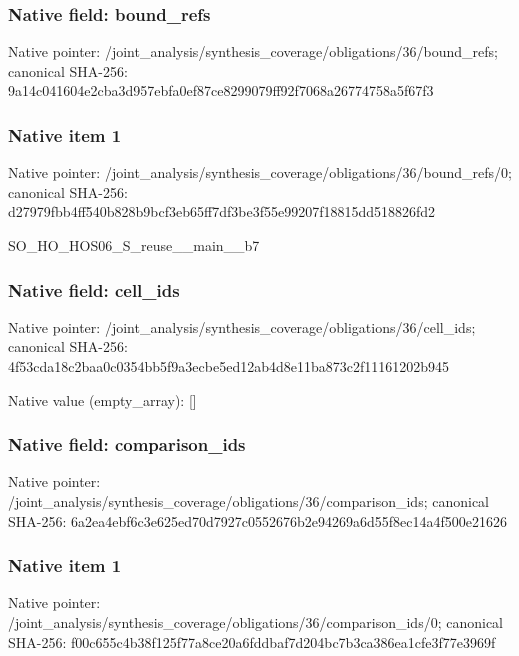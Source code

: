 \documentclass[10pt,a4paper]{article}
\begin{document}
\subsubsection{Native field: bound\_\allowbreak{}refs}
Native pointer: /joint\_\allowbreak{}analysis/synthesis\_\allowbreak{}coverage/obligations/36/bound\_\allowbreak{}refs; canonical SHA-256: 9a14c041604e2cba3d957ebfa0ef87ce8299079ff92f7068a26774758a5f67f3

\subsubsection{Native item 1}
Native pointer: /joint\_\allowbreak{}analysis/synthesis\_\allowbreak{}coverage/obligations/36/bound\_\allowbreak{}refs/0; canonical SHA-256: d27979fbb4ff540b828b9bcf3eb65ff7df3be3f55e99207f18815dd518826fd2

\begingroup\raggedright\sloppy SO\_\allowbreak{}HO\_\allowbreak{}HOS06\_\allowbreak{}S\_\allowbreak{}reuse\_\allowbreak{}\_\allowbreak{}main\_\allowbreak{}\_\allowbreak{}b7\par\endgroup

\subsubsection{Native field: cell\_\allowbreak{}ids}
Native pointer: /joint\_\allowbreak{}analysis/synthesis\_\allowbreak{}coverage/obligations/36/cell\_\allowbreak{}ids; canonical SHA-256: 4f53cda18c2baa0c0354bb5f9a3ecbe5ed12ab4d8e11ba873c2f11161202b945

Native value (empty\_\allowbreak{}array): []

\subsubsection{Native field: comparison\_\allowbreak{}ids}
Native pointer: /joint\_\allowbreak{}analysis/synthesis\_\allowbreak{}coverage/obligations/36/comparison\_\allowbreak{}ids; canonical SHA-256: 6a2ea4ebf6c3e625ed70d7927c0552676b2e94269a6d55f8ec14a4f500e21626

\subsubsection{Native item 1}
Native pointer: /joint\_\allowbreak{}analysis/synthesis\_\allowbreak{}coverage/obligations/36/comparison\_\allowbreak{}ids/0; canonical SHA-256: f00c655c4b38f125f77a8ce20a6fddbaf7d204bc7b3ca386ea1cfe3f77e3969f
\end{document}
